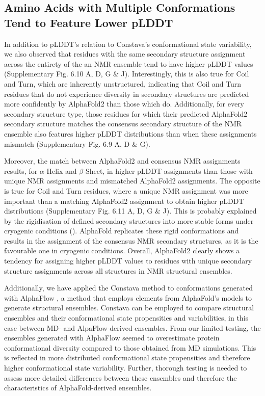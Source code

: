 \subsection{Amino Acids with Multiple Conformations Tend to Feature Lower pLDDT}

In addition to pLDDT's relation to Constava's conformational state variability, we also observed that residues with the same secondary structure assignment across the entirety of the an NMR ensemble tend to have higher pLDDT values (Supplementary Fig. 6.10 A, D, G \& J). 
Interestingly, this is also true for Coil and Turn, which are inherently unstructured, indicating that Coil and Turn residues that do not experience diversity in secondary structures are predicted more confidently by AlphaFold2 than those which do. Additionally, for every secondary structure type, those residues for which their predicted AlphaFold2 secondary structure matches the consensus secondary structure of the NMR ensemble also features higher pLDDT distributions than when these assignments mismatch (Supplementary Fig. 6.9 A, D \& G). 

Moreover, the match between AlphaFold2 and consensus NMR assignments results, for $\alpha$-Helix and $\beta$-Sheet, in higher pLDDT assignments than those with unique NMR assignments and mismatched AlphaFold2 assignments. The opposite is true for Coil and Turn residues, where a unique NMR assignment was more important than a matching AlphaFold2 assignment to obtain higher pLDDT distributions (Supplementary Fig. 6.11 A, D, G \& J).
This is probably explained by the rigidisation of defined secondary structures into more stable forms under cryogenic conditions (). AlphaFold replicates these rigid conformations and results in the assignment of the consensus NMR secondary structures, as it is the favourable one in cryogenic conditions. Overall, AlphaFold2 clearly shows a tendency for assigning higher pLDDT values to residues with unique secondary structure assignments across all structures in NMR structural ensembles.

Additionally, we have applied the Constava method to conformations generated with AlphaFlow \cite{jing_alphafold_2024}, a method that employs elements from AlphaFold's models to generate structural ensembles. Constava can be employed to compare structural ensembles and their conformational state propensities and variabilities, in this case between MD- and AlpaFlow-derived ensembles. From our limited testing, the ensembles generated with AlphaFlow seemed to overestimate protein conformational diversity compared to those obtained from MD simulations. This is reflected in more distributed conformational state propensities and therefore higher conformational state variability. Further, thorough testing is needed to assess more detailed differences between these ensembles and therefore the characteristics of AlphaFold-derived ensembles.


